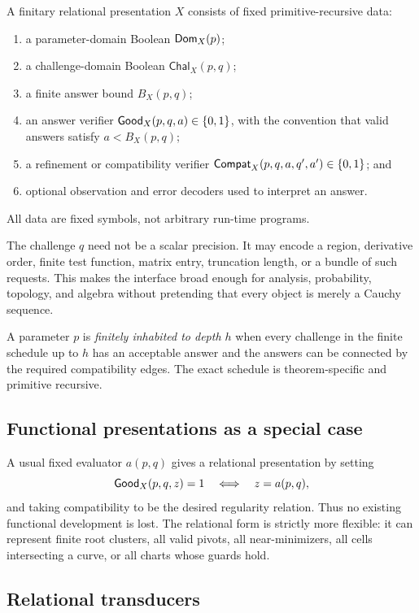 \begin{definition}
A finitary relational presentation \(X\) consists of fixed
primitive-recursive data:
\begin{enumerate}
\item a parameter-domain Boolean \(\mathsf{Dom}_X(p)\);
\item a challenge-domain Boolean \(\mathsf{Chal}_X(p,q)\);
\item a finite answer bound \(B_X(p,q)\);
\item an answer verifier \(\mathsf{Good}_X(p,q,a)\in\{0,1\}\), with the convention that
      valid answers satisfy \(a<B_X(p,q)\);
\item a refinement or compatibility verifier
      \(\mathsf{Compat}_X(p,q,a,q',a')\in\{0,1\}\); and
\item optional observation and error decoders used to interpret an answer.
\end{enumerate}
All data are fixed symbols, not arbitrary run-time programs.
\end{definition}

The challenge \(q\) need not be a scalar precision.  It may encode a region,
derivative order, finite test function, matrix entry, truncation length, or a
bundle of such requests.  This makes the interface broad enough for analysis,
probability, topology, and algebra without pretending that every object is
merely a Cauchy sequence.

A parameter \(p\) is \emph{finitely inhabited to depth \(h\)} when every
challenge in the finite schedule up to \(h\) has an acceptable answer and the
answers can be connected by the required compatibility edges.  The exact
schedule is theorem-specific and primitive recursive.

\subsection{Functional presentations as a special case}

A usual fixed evaluator \(a(p,q)\) gives a relational presentation by setting
\[
 \mathsf{Good}_X(p,q,z)=1 \quad\Longleftrightarrow\quad z=a(p,q),
\]
and taking compatibility to be the desired regularity relation.  Thus no
existing functional development is lost.  The relational form is strictly
more flexible: it can represent finite root clusters, all valid pivots, all
near-minimizers, all cells intersecting a curve, or all charts whose guards
hold.

\subsection{Relational transducers}

